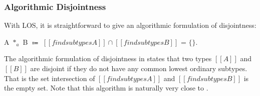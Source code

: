\subsubsection*{Algorithmic Disjointness}
With LOS, it is straightforward to give an algorithmic formulation of
disjointness:

\begin{definition}
\label{def:inter:ad}
  A $*_a$ B $\Coloneqq$  $ [[findsubtypes A]] \cap [[findsubtypes B]] $ = $\{\}$.
\end{definition}

\noindent The algorithmic formulation of disjointness in
 states that two
types $[[A]]$ and $[[B]]$ are disjoint
if they do not have any common lowest ordinary subtypes. That is the
set intersection of $[[findsubtypes A]]$ and $[[findsubtypes B]]$ is the empty set.
Note that this algorithm is naturally very close to .

